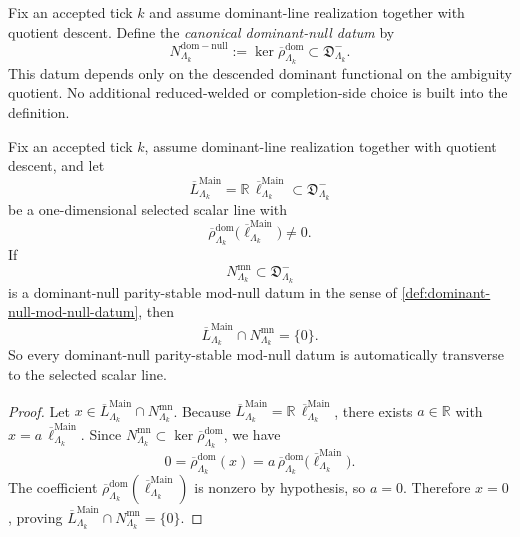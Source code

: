 \documentclass[11pt]{article}
\begin{document}
\begin{definition}
\label{def:canonical-dominant-null-datum}
Fix an accepted tick \(k\) and assume dominant-line realization together with quotient descent.
Define the \emph{canonical dominant-null datum} by
\[
N^{\mathrm{dom-null}}_{\Lambda_k}
:=
\ker \overline{\rho}^{\mathrm{dom}}_{\Lambda_k}
\subset
\mathfrak D^-_{\Lambda_k}.
\]
This datum depends only on the descended dominant functional on the ambiguity quotient.
No additional reduced-welded or completion-side choice is built into the definition.
\end{definition}

\begin{lemma}
\label{lem:dominant-kernel-transversality}
Fix an accepted tick \(k\), assume dominant-line realization together with quotient descent, and let
\[
\overline L^{\mathrm{Main}}_{\Lambda_k}
=
\mathbb R\,\overline\ell^{\mathrm{Main}}_{\Lambda_k}
\subset
\mathfrak D^-_{\Lambda_k}
\]
be a one-dimensional selected scalar line with
\[
\overline{\rho}^{\mathrm{dom}}_{\Lambda_k}
\!\bigl(
\overline\ell^{\mathrm{Main}}_{\Lambda_k}
\bigr)
\neq 0.
\]
If
\[
N^{\mathrm{mn}}_{\Lambda_k}\subset \mathfrak D^-_{\Lambda_k}
\]
is a dominant-null parity-stable mod-null datum in the sense of
\cref{def:dominant-null-mod-null-datum},
then
\[
\overline L^{\mathrm{Main}}_{\Lambda_k}\cap N^{\mathrm{mn}}_{\Lambda_k}=\{0\}.
\]
So every dominant-null parity-stable mod-null datum is automatically transverse to the selected
scalar line.
\end{lemma}

\begin{proof}
Let
\(
x\in \overline L^{\mathrm{Main}}_{\Lambda_k}\cap N^{\mathrm{mn}}_{\Lambda_k}
\).
Because
\(
\overline L^{\mathrm{Main}}_{\Lambda_k}
=
\mathbb R\,\overline\ell^{\mathrm{Main}}_{\Lambda_k}
\),
there exists \(a\in\mathbb R\) with
\(
x=a\,\overline\ell^{\mathrm{Main}}_{\Lambda_k}
\).
Since
\(
N^{\mathrm{mn}}_{\Lambda_k}\subset
\ker \overline{\rho}^{\mathrm{dom}}_{\Lambda_k}
\),
we have
\[
0
=
\overline{\rho}^{\mathrm{dom}}_{\Lambda_k}(x)
=
a\,
\overline{\rho}^{\mathrm{dom}}_{\Lambda_k}
\!\bigl(
\overline\ell^{\mathrm{Main}}_{\Lambda_k}
\bigr).
\]
The coefficient
\(
\overline{\rho}^{\mathrm{dom}}_{\Lambda_k}
(\overline\ell^{\mathrm{Main}}_{\Lambda_k})
\)
is nonzero by hypothesis, so \(a=0\).
Therefore \(x=0\), proving
\(
\overline L^{\mathrm{Main}}_{\Lambda_k}\cap N^{\mathrm{mn}}_{\Lambda_k}=\{0\}
\).
\end{proof}
\end{document}
